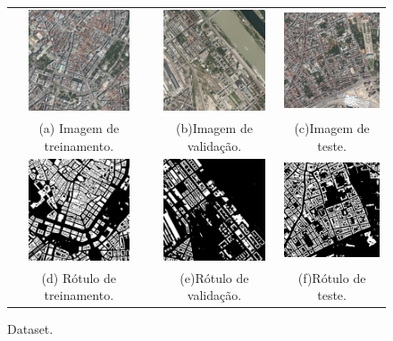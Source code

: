 \documentclass{bmvc2k}
\begin{document}
\begin{figure}[htb]
\begin{tabular}{ccc}
  \includegraphics[width=30mm]{figs/train.jpg} &   \includegraphics[width=30mm]{figs/val.jpg} &   \includegraphics[width=30mm]{figs/test.jpg}\\
(a) Imagem de treinamento. & (b)Imagem de validação. & (c)Imagem de teste.  \\[6pt]
 \includegraphics[width=30mm]{figs/train_label.jpg} &   \includegraphics[width=30mm]{figs/val_label.jpg}  &   \includegraphics[width=30mm]{figs/test_label.jpg}\\
(d) Rótulo de treinamento. & (e)Rótulo de validação. & (f)Rótulo de teste.  \\[6pt]
\end{tabular}
\caption{Dataset.}
\label{fig:dataset}
\end{figure}
\end{document}
